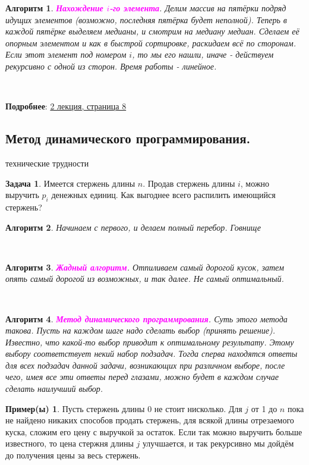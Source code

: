 \documentclass[a4paper]{article}
\theoremstyle{indented}
\newtheorem{alg}{Алгоритм}
\theoremstyle{definition}
\newtheorem{exl}{Пример(ы)}
\newtheorem{prob}{Задача}
\theoremstyle{remark}
\begin{document}
\begin{alg}
    \textcolor{magenta}{\hypertarget{t4}{\textbf{Нахождение $i$-го элемента}}}. Делим массив на пятёрки подряд идущих элементов (возможно, последняя пятёрка будет неполной). Теперь в каждой пятёрке выделяем медианы, и смотрим на медиану медиан. Сделаем её опорным элементом и как в быстрой сортировке, раскидаем всё по сторонам. Если этот элемент под номером $i$, то мы его нашли, иначе - действуем рекурсивно с одной из сторон. Время работы - линейное.
\end{alg} \

\textbf{Подробнее}: \href{https://users.math-cs.spbu.ru/~okhotin/teaching/algorithms_2020/okhotin_algorithms_2020_l2.pdf}{2 лекция, страница 8}

\subsection{Метод динамического программирования.}

\hypertarget{e1}{технические трудности}

\begin{prob}
    Имеется стержень длины $n$. Продав стержень длины $i$, можно выручить $p_i$ денежных единиц. Как выгоднее всего распилить имеющийся стержень?
\end{prob}

\begin{alg}
    Начинаем с первого, и делаем полный перебор. Говнище
\end{alg} \ 

\begin{alg}
    \textcolor{magenta}{\hypertarget{t6}{\textbf{Жадный алгоритм}}}. Отпиливаем самый дорогой кусок, затем опять самый дорогой из возможных, и так далее. Не самый оптимальный.
\end{alg} \ 

\begin{alg}
    \textcolor{magenta}{\hypertarget{t7}{\textbf{Метод динамического программрования}}}. Суть этого метода такова. Пусть на каждом шаге надо сделать выбор (принять решение). Известно, что какой-то выбор приводит к оптимальному результату. Этому выбору соответствует некий набор подзадач. Тогда сперва находятся ответы для всех подзадач данной задачи, возникающих при различном выборе, после чего, имея все эти ответы перед глазами, можно будет в каждом случае сделать наилучший выбор.
\end{alg}

\begin{exl}
    Пусть стержень длины 0 не стоит нисколько. Для $j$ от 1 до $n$ пока не найдено никаких способов продать стержень, для всякой длины отрезаемого куска, сложим его цену с выручкой за остаток. Если так можно выручить больше известного, то цена стержня длины $j$ улучшается, и так рекурсивно мы дойдём до получения цены за весь стержень. 
\end{exl}
\end{document}
